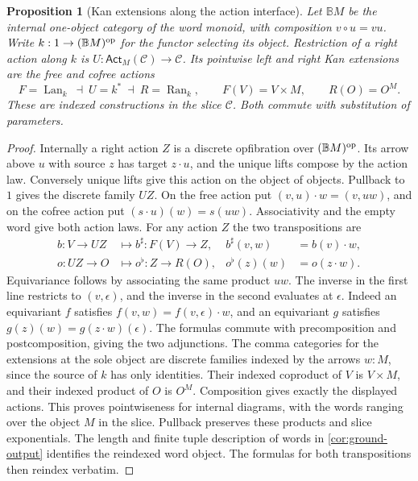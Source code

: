 \documentclass[11pt,a4paper]{article}
\newtheorem{proposition}[proposition]{Proposition}
\theoremstyle{definition}
\theoremstyle{remark}\newaliascnt{remark}{theorem}
\numberwithin{equation}{section}
\begin{document}
\begin{proposition}[Kan extensions along the action interface]\label{prop:ground-action-kan}
Let \(\mathbb BM\) be the internal one-object category of the word monoid, with composition \(v\circ u=vu\). Write \(k:1\to(\mathbb BM)^{\rm op}\) for the functor selecting its object. Restriction of a right action along \(k\) is \(U:\mathsf{Act}_M(\mathcal C)\to\mathcal C\). Its pointwise left and right Kan extensions are the free and cofree actions
\[
 F=\operatorname{Lan}_k \ \dashv\ U=k^*\ \dashv\
 R=\operatorname{Ran}_k,\qquad F(V)=V\times M,\qquad R(O)=O^M .
\]
These are indexed constructions in the slice \(\mathcal C\). Both commute with substitution of parameters.
\end{proposition}
\begin{proof}
Internally a right action \(Z\) is a discrete opfibration over \((\mathbb BM)^{\rm op}\). Its arrow above \(u\) with source \(z\) has target \(z\cdot u\), and the unique lifts compose by the action law. Conversely unique lifts give this action on the object of objects. Pullback to \(1\) gives the discrete family \(UZ\). On the free action put \((v,u)\cdot w=(v,uw)\), and on the cofree action put \((s\cdot u)(w)=s(uw)\). Associativity and the empty word give both action laws. For any action \(Z\) the two transpositions are
\[
\begin{aligned}
 b:V\to UZ &\longmapsto b^\sharp:F(V)\to Z,
     & b^\sharp(v,w)&=b(v)\cdot w ,\\
 o:UZ\to O &\longmapsto o^\flat:Z\to R(O),
     & o^\flat(z)(w)&=o(z\cdot w).
\end{aligned}
\]
Equivariance follows by associating the same product \(uw\). The inverse in the first line restricts to \((v,\epsilon)\), and the inverse in the second evaluates at \(\epsilon\). Indeed an equivariant \(f\) satisfies \(f(v,w)=f(v,\epsilon)\cdot w\), and an equivariant \(g\) satisfies \(g(z)(w)=g(z\cdot w)(\epsilon)\). The formulas commute with precomposition and postcomposition, giving the two adjunctions. The comma categories for the extensions at the sole object are discrete families indexed by the arrows \(w:M\), since the source of \(k\) has only identities. Their indexed coproduct of \(V\) is \(V\times M\), and their indexed product of \(O\) is \(O^M\). Composition gives exactly the displayed actions. This proves pointwiseness for internal diagrams, with the words ranging over the object \(M\) in the slice. Pullback preserves these products and slice exponentials. The length and finite tuple description of words in \cref{cor:ground-output} identifies the reindexed word object. The formulas for both transpositions then reindex verbatim.
\end{proof}
\end{document}
